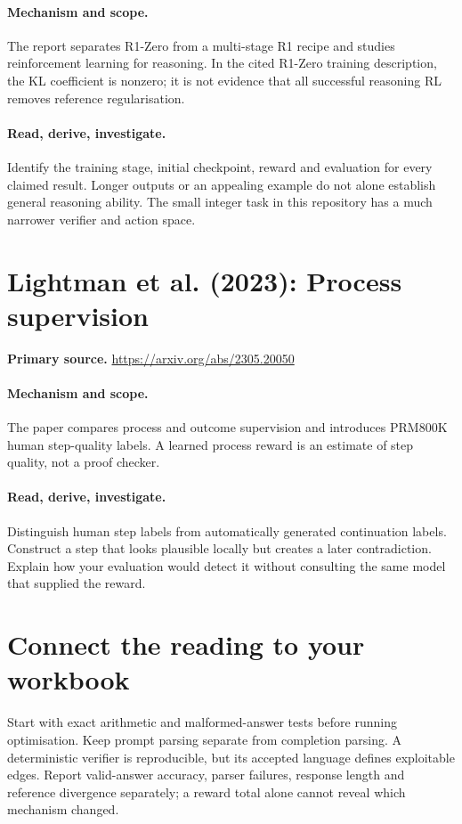 \documentclass[11pt]{scrartcl}
\begin{document}
\paragraph{Mechanism and scope.} The report separates R1-Zero from a multi-stage R1 recipe and studies reinforcement learning for reasoning. In the cited R1-Zero training description, the KL coefficient is nonzero; it is not evidence that all successful reasoning RL removes reference regularisation.

\paragraph{Read, derive, investigate.} Identify the training stage, initial checkpoint, reward and evaluation for every claimed result. Longer outputs or an appealing example do not alone establish general reasoning ability. The small integer task in this repository has a much narrower verifier and action space.

\section{Lightman et al. (2023): Process supervision}
\noindent\textbf{Primary source.} \url{https://arxiv.org/abs/2305.20050}

\paragraph{Mechanism and scope.} The paper compares process and outcome supervision and introduces PRM800K human step-quality labels. A learned process reward is an estimate of step quality, not a proof checker.

\paragraph{Read, derive, investigate.} Distinguish human step labels from automatically generated continuation labels. Construct a step that looks plausible locally but creates a later contradiction. Explain how your evaluation would detect it without consulting the same model that supplied the reward.

\section*{Connect the reading to your workbook}
Start with exact arithmetic and malformed-answer tests before running optimisation. Keep prompt parsing separate from completion parsing. A deterministic verifier is reproducible, but its accepted language defines exploitable edges. Report valid-answer accuracy, parser failures, response length and reference divergence separately; a reward total alone cannot reveal which mechanism changed.
\end{document}
